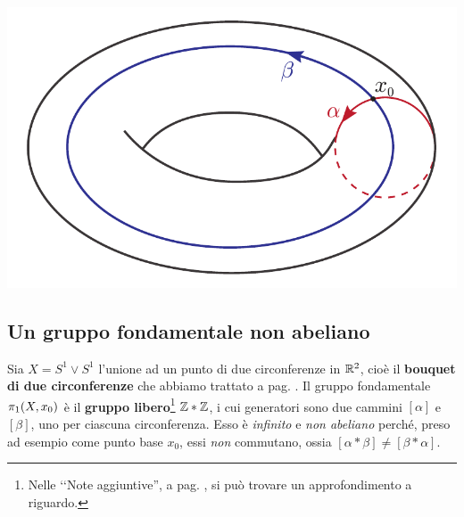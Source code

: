 	\begin{minipage}{.47\linewidth}
		\begin{center}
				\includegraphics[trim=0cm 0cm 0cm 0cm,clip,scale=0.5]{images/torusgenerator.pdf}
		\end{center}
\end{minipage}
\subsection{Un gruppo fondamentale non abeliano}
Sia $X=S^1\vee S^1$ l'unione ad un punto di due circonferenze in $\mathbb{R}^2$, cioè il \textbf{bouquet di due circonferenze} che abbiamo trattato a pag. \pageref{bouquet}. Il gruppo fondamentale $\homotopy[1]{X,x_0}$ è il \textbf{gruppo libero}\footnote{Nelle ‘‘Note aggiuntive'', a pag. \pageref{gruppolibero}, si può trovare un approfondimento a riguardo.} $\mathbb{Z}\ast\mathbb{Z}$, i cui generatori sono due cammini $[\alpha]$ e $[\beta]$, uno per ciascuna circonferenza. Esso è \textit{infinito} e \textit{non abeliano} perché, preso ad esempio come punto base $x_0$, essi \textit{non} commutano, ossia $[\alpha\ast\beta]\neq [\beta\ast\alpha]$.
